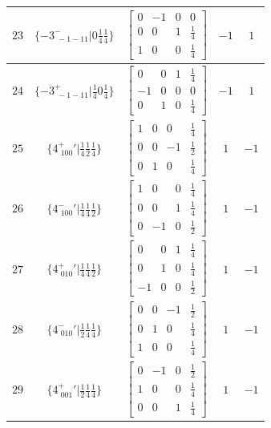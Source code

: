 \documentclass[fleqn,8pt]{jsarticle}
\begin{document}
\begin{longtable}{ccccc}
$ 23 $ & $ \{-3^{-}_{\,\,-1-11}|0 \frac{1}{4} \frac{1}{4}\} $ & $ \begin{bmatrix} 0 & -1 & 0 & 0 \\ 0 & 0 & 1 & \frac{1}{4} \\ 1 & 0 & 0 & \frac{1}{4} \end{bmatrix} $ & $ -1 $ & $ 1 $ \\ \hline
$ 24 $ & $ \{-3^{+}_{\,\,-1-11}|\frac{1}{4} 0 \frac{1}{4}\} $ & $ \begin{bmatrix} 0 & 0 & 1 & \frac{1}{4} \\ -1 & 0 & 0 & 0 \\ 0 & 1 & 0 & \frac{1}{4} \end{bmatrix} $ & $ -1 $ & $ 1 $ \\ \hline
$ 25 $ & $ \{4^{+}_{\,\,100}{}'|\frac{1}{4} \frac{1}{2} \frac{1}{4}\} $ & $ \begin{bmatrix} 1 & 0 & 0 & \frac{1}{4} \\ 0 & 0 & -1 & \frac{1}{2} \\ 0 & 1 & 0 & \frac{1}{4} \end{bmatrix} $ & $ 1 $ & $ -1 $ \\ \hline
$ 26 $ & $ \{4^{-}_{\,\,100}{}'|\frac{1}{4} \frac{1}{4} \frac{1}{2}\} $ & $ \begin{bmatrix} 1 & 0 & 0 & \frac{1}{4} \\ 0 & 0 & 1 & \frac{1}{4} \\ 0 & -1 & 0 & \frac{1}{2} \end{bmatrix} $ & $ 1 $ & $ -1 $ \\ \hline
$ 27 $ & $ \{4^{+}_{\,\,010}{}'|\frac{1}{4} \frac{1}{4} \frac{1}{2}\} $ & $ \begin{bmatrix} 0 & 0 & 1 & \frac{1}{4} \\ 0 & 1 & 0 & \frac{1}{4} \\ -1 & 0 & 0 & \frac{1}{2} \end{bmatrix} $ & $ 1 $ & $ -1 $ \\ \hline
$ 28 $ & $ \{4^{-}_{\,\,010}{}'|\frac{1}{2} \frac{1}{4} \frac{1}{4}\} $ & $ \begin{bmatrix} 0 & 0 & -1 & \frac{1}{2} \\ 0 & 1 & 0 & \frac{1}{4} \\ 1 & 0 & 0 & \frac{1}{4} \end{bmatrix} $ & $ 1 $ & $ -1 $ \\ \hline
$ 29 $ & $ \{4^{+}_{\,\,001}{}'|\frac{1}{2} \frac{1}{4} \frac{1}{4}\} $ & $ \begin{bmatrix} 0 & -1 & 0 & \frac{1}{2} \\ 1 & 0 & 0 & \frac{1}{4} \\ 0 & 0 & 1 & \frac{1}{4} \end{bmatrix} $ & $ 1 $ & $ -1 $ \\ \hline

\end{longtable}
\end{document}
